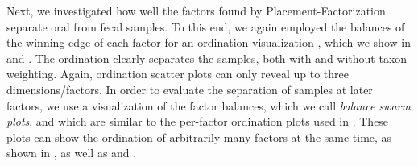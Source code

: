 Next, we investigated how well the factors found by Placement-Factorization separate oral from fecal samples.
To this end, we again employed the balances of the winning edge of each factor for an ordination visualization \cite{Washburne2017a},
which we show in 
and .
The ordination clearly separates the samples, both with and without taxon weighting.
Again, ordination scatter plots can only reveal up to three dimensions/factors.
In order to evaluate the separation of samples at later factors,
we use a visualization of the factor balances, which we call \emph{balance swarm plots},
and which are similar to the per-factor ordination plots used in \cite{Washburne2019}.
These plots can show the ordination of arbitrarily many factors at the same time,
as shown in ,
as well as 
and .

